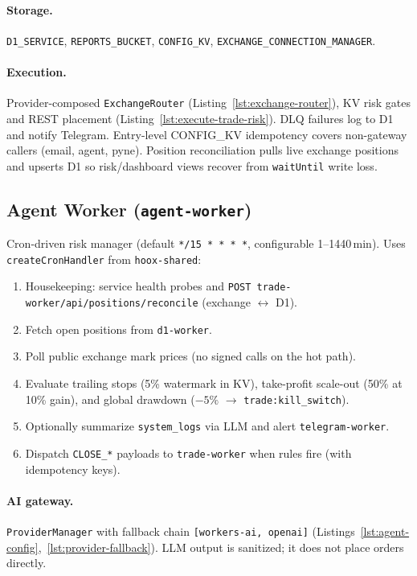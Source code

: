 \paragraph{Storage.} \texttt{D1\_SERVICE}, \texttt{REPORTS\_BUCKET}, \texttt{CONFIG\_KV}, \texttt{EXCHANGE\_CONNECTION\_MANAGER}.

\paragraph{Execution.} Provider-composed \texttt{ExchangeRouter} (Listing~\ref{lst:exchange-router}), KV risk gates and REST placement (Listing~\ref{lst:execute-trade-risk}). DLQ failures log to D1 and notify Telegram. Entry-level CONFIG\_KV idempotency covers non-gateway callers (email, agent, pyne). Position reconciliation pulls live exchange positions and upserts D1 so risk/dashboard views recover from \texttt{waitUntil} write loss.

\subsection{Agent Worker (\texttt{agent-worker})}

Cron-driven risk manager (default \texttt{*/15 * * * *}, configurable 1--1440\,min). Uses \texttt{createCronHandler} from \texttt{hoox-shared}:

\begin{enumerate}
  \item Housekeeping: service health probes and \texttt{POST trade-worker/api/positions/reconcile} (exchange $\leftrightarrow$ D1).
  \item Fetch open positions from \texttt{d1-worker}.
  \item Poll public exchange mark prices (no signed calls on the hot path).
  \item Evaluate trailing stops (5\% watermark in KV), take-profit scale-out (50\% at 10\% gain), and global drawdown ($-5\%$ $\rightarrow$ \texttt{trade:kill\_switch}).
  \item Optionally summarize \texttt{system\_logs} via LLM and alert \texttt{telegram-worker}.
  \item Dispatch \texttt{CLOSE\_*} payloads to \texttt{trade-worker} when rules fire (with idempotency keys).
\end{enumerate}

\paragraph{AI gateway.} \texttt{ProviderManager} with fallback chain \texttt{[workers-ai, openai]} (Listings~\ref{lst:agent-config},~\ref{lst:provider-fallback}). LLM output is sanitized; it does not place orders directly.

